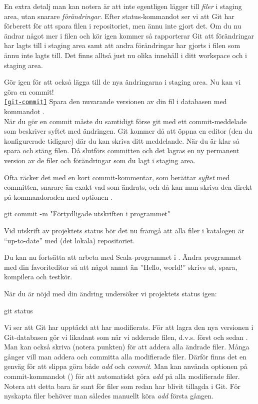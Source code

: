\begin{Datorarbete}
En extra detalj man kan notera är att  inte egentligen lägger till \emph{filer} i staging area, utan snarare \emph{förändringar}. Efter status-kommandot ser vi att Git har förberett för att spara filen i repositoriet, men ännu inte gjort det. Om du nu ändrar något mer i filen och kör  igen kommer så rapporterar Git att förändringar har lagts till i staging area samt att andra förändringar har gjorts i filen som ännu inte lagts till. Det finns alltså just nu olika innehåll i ditt workspace och i staging area.

Gör  igen för att också lägga till de nya ändringarna i staging area. Nu kan vi göra en commit!
\\

\texttt{\ref{git-commit}} Spara den nuvarande versionen av din fil i databasen med kommandot .
\\

När du gör en commit måste du samtidigt förse git med ett commit-meddelade som beskriver syftet med ändringen. Git kommer då att öppna en editor (den du konfigurerade tidigare) där du kan skriva ditt meddelande. När du är klar så spara och stäng filen. Då slutförs committen och det lagras en ny permanent version av de filer och förändringar som du lagt i staging area.

Ofta räcker det med en kort commit-kommentar, som berättar \emph{syftet} med committen, snarare än exakt vad som ändrats, och då kan man skriva den direkt på kommandoraden med optionen .

\begin{Code}
git commit -m "Förtydligade utskriften i programmet"
\end{Code}

Vid utskrift av projektets status bör det nu framgå att alla filer i katalogen är \enquote{up-to-date} med (det lokala) repositoriet.

Du kan nu fortsätta att arbeta med Scala-programmet i . Ändra programmet med din favoriteditor så att något annat än ''Hello, world!'' skrivs ut, spara, kompilera och testkör.

När du är nöjd med din ändring undersöker vi projektets status igen:

\begin{Code}
git status
\end{Code}

Vi ser att Git har upptäckt att  har modifierats. För att lagra den nya versionen i Git-databasen gör vi likadant som när vi adderade filen, d.v.s. först  och sedan . Man kan också skriva   (notera punkten) för att addera alla ändrade filer.	Många gånger vill man addera och committa alla modifierade filer. Därför finns det en genväg för att slippa göra både \emph{add} och \emph{commit}. Man kan använda optionen  på commit-kommandot () för att automatiskt göra \emph{add} på alla modifierade filer. Notera att detta bara är sant för filer som redan har blivit tillagda i Git. För nyskapta filer behöver man således manuellt köra \emph{add} första gången.
\\


\end{Datorarbete}
